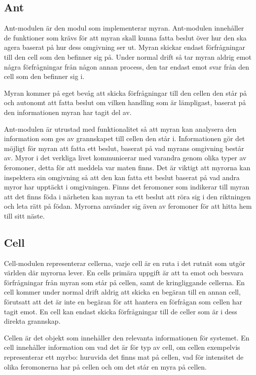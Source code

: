 \subsection{Ant}

Ant-modulen är den modul som implementerar myran. Ant-modulen innehåller de funktioner som krävs för att myran skall kunna fatta beslut över hur den ska agera baserat på hur dess omgivning ser ut. Myran skickar endast förfrågningar till den cell som den befinner sig på. Under normal drift så tar myran aldrig emot några förfrågningar från någon annan process, den tar endast emot svar från den cell som den befinner sig i.

Myran kommer på eget bevåg att skicka förfrågningar till den cellen den står på och autonomt att fatta beslut om vilken handling som är lämpligast, baserat på den informationen myran har tagit del av.

Ant-modulen är utrustad med funktionalitet så att myran kan analysera den information som ges av grannskapet till cellen den står i. Informationen gör det möjligt för myran att fatta ett beslut, baserat på vad myrans omgivning består av. Myror i det verkliga livet kommunicerar med varandra genom olika typer av feromoner, detta för att meddela var maten finns. Det är viktigt att myrorna kan inspektera sin omgivning så att den kan fatta ett beslut baserat på vad andra myror har upptäckt i omgivningen. Finns det feromoner som indikerar till myran att det finns föda i närheten kan myran ta ett beslut att röra sig i den riktningen och leta rätt på födan. Myrorna använder sig även av feromoner för att hitta hem till sitt näste. 


\subsection{Cell}

Cell-modulen representerar cellerna, varje cell är en ruta i det rutnät som utgör världen där myrorna lever. En cells primära uppgift är att ta emot och besvara förfrågningar från myran som står på cellen, samt de kringliggande cellerna. En cell kommer under normal drift aldrig att skicka en begäran till en annan cell, förutsatt att det är inte en begäran för att hantera en förfrågan som cellen har tagit emot. En cell kan endast skicka förfrågningar till de celler som är i dess direkta grannskap.

Cellen är det objekt som innehåller den relevanta informationen för systemet. En cell innehåller information om vad det är för typ av cell, om cellen exempelvis representerar ett myrbo: huruvida det finns mat på cellen, vad för intensitet de olika feromonerna har på cellen och om det står en myra på cellen.

